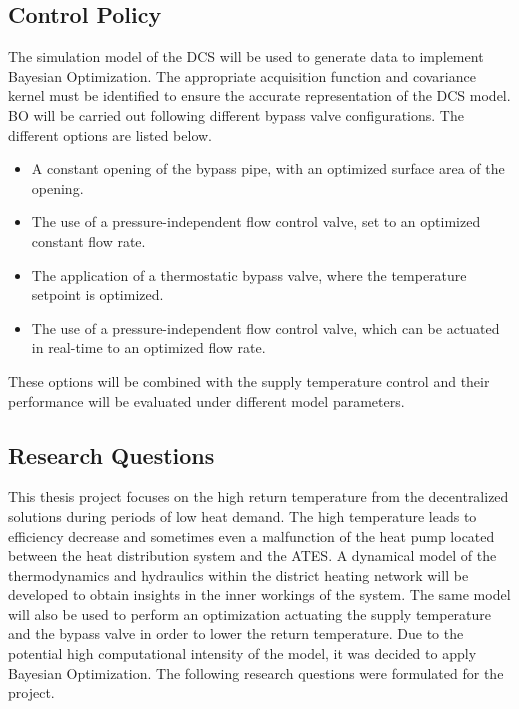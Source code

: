 \subsection{Control Policy}
The simulation model of the DCS will be used to generate data to implement Bayesian Optimization. The appropriate acquisition function and covariance kernel must be identified to ensure the accurate representation of the DCS model. BO will be carried out following different bypass valve configurations. The different options are listed below.

\begin{itemize} 
    \item A constant opening of the bypass pipe, with an optimized surface area of the opening. 
    \item The use of a pressure-independent flow control valve, set to an optimized constant flow rate. 
    \item The application of a thermostatic bypass valve, where the temperature setpoint is optimized. 
    \item The use of a pressure-independent flow control valve, which can be actuated in real-time to an optimized flow rate.
\end{itemize}

These options will be combined with the supply temperature control and their performance will be evaluated under different model parameters. 


\newpage
\subsection{Research Questions}
This thesis project focuses on the high return temperature from the decentralized solutions during periods of low heat demand. The high temperature leads to efficiency decrease and sometimes even a malfunction of the heat pump located between the heat distribution system and the ATES. A dynamical model of the thermodynamics and hydraulics within the district heating network will be developed to obtain insights in the inner workings of the system. The same model will also be used to perform an optimization actuating the supply temperature and the bypass valve in order to lower the return temperature. Due to the potential high computational intensity of the model, it was decided to apply Bayesian Optimization. The following research questions were formulated for the project.  

